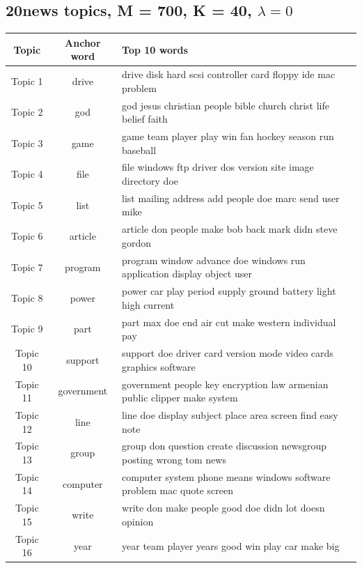 \documentclass{article}
\begin{document}
\newpage


\subsection{20news topics, M = 700, K = 40, $\lambda=0$}
\label{appendix:K40-LAMBDA0}

\begin{table}[h]
   \begin{center}
  \begin{tabular}{|c|c|l|} \hline
           Topic & Anchor word & Top 10 words \\ \hline
Topic	1	&	drive & drive disk hard scsi controller card floppy ide mac problem	\\ \hline
Topic	2	&	god & god jesus christian people bible church christ life belief faith	\\ \hline
Topic	3	&	game & game team player play win fan hockey season run baseball	\\ \hline
Topic	4	&	file & file windows ftp driver dos version site image directory doe	\\ \hline
Topic	5	&	list & list mailing address add people doe marc send user mike	\\ \hline
Topic	6	&	article & article don people make bob back mark didn steve gordon	\\ \hline
Topic	7	&	program & program window advance doe windows run application display object user	\\ \hline
Topic	8	&	power & power car play period supply ground battery light high current	\\ \hline
Topic	9	&	part & part max doe end air cut make western individual pay	\\ \hline
Topic	10	&	support & support doe driver card version mode video cards graphics software	\\ \hline
Topic	11	&	government & government people key encryption law armenian public clipper make system	\\ \hline
Topic	12	&	line & line doe display subject place area screen find easy note	\\ \hline
Topic	13	&	group & group don question create discussion newsgroup posting wrong tom news	\\ \hline
Topic	14	&	computer & computer system phone means windows software problem mac quote screen	\\ \hline
Topic	15	&	write & write don make people good doe didn lot doesn opinion	\\ \hline
Topic	16	&	year & year team player years good win play car make big	\\ \hline

\end{tabular}
\end{center}
\end{table}
\end{document}
